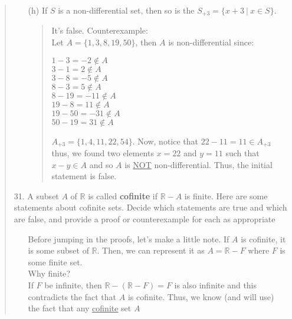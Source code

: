 \documentclass[12pt, a4paper]{article}                      %
\begin{document}
\begin{enumerate}
\begin{quote}
\begin{itemize}
If $S$ is non-differential, so is $\mathbb{Z} - S$.
\begin{quote}
It's false. Counterexample:\\
Let $A = \{1, 3\}$. $A$ is non-differential since $1 - 3 = -2 \notin A$ and $3 - 1 = 2 \notin A$.
Then we know that $Z - A$ would include numbers $7,8,15$. But $15 - 8 = 7 \in Z - A$ which is not
non-differential.
\end{quote}
\item[(h)]
If $S$ is a non-differential set, then so is the $S_{+3} = \{x + 3 \ | \ x \in S\}$.
\begin{quote}
It's false. Counterexample:\\
Let $A = \{1, 3, 8, 19, 50\}$, then $A$ is non-differential since:
\begin{center}
$1 - 3 = -2 \notin A$\\
$3 - 1 = 2 \notin A$\\
$3 - 8 = -5 \notin A$\\
$8 - 3 = 5 \notin A$\\
$8 - 19 = -11 \notin A$\\
$19 - 8 = 11 \notin A$\\
$19 - 50 = -31 \notin A$\\
$50 - 19 = 31 \notin A$\\
\end{center}
$A_{+3} = \{1, 4, 11, 22, 54\}$. Now, notice that $22 - 11 = 11 \in A_{+3}$ thus, we found
two elements $x = 22$ and $y = 11$ such that $x - y \in A$ and so $A$ is \underline{NOT} non-differential.
Thus, the initial statement is false.
\end{quote}
\end{itemize}
\item[31.]
A subset $A$ of $\mathbb{R}$ is called \textbf{cofinite} if $\mathbb{R} - A$ is finite. Here are some statements about
cofinite sets. Decide which statements are true and which are false, and provide a proof
or counterexample for each as appropriate
\begin{itemize}
\item[]
Before jumping in the proofs, let's make a little note.
If $A$ is cofinite, it is some subset of $\mathbb{R}$.
Then, we can represent it as $A = \mathbb{R} - F$
where $F$ is some finite set.\\
Why finite?\\
If $F$ be infinite, then $\mathbb{R} - (\mathbb{R} - F) = F$ is also
infinite and this contradicts the fact that $A$ is cofinite.
Thus, we know (and will use) the fact that any \underline{cofinite} set $A$

\end{itemize}
\end{quote}
\end{enumerate}
\end{document}
